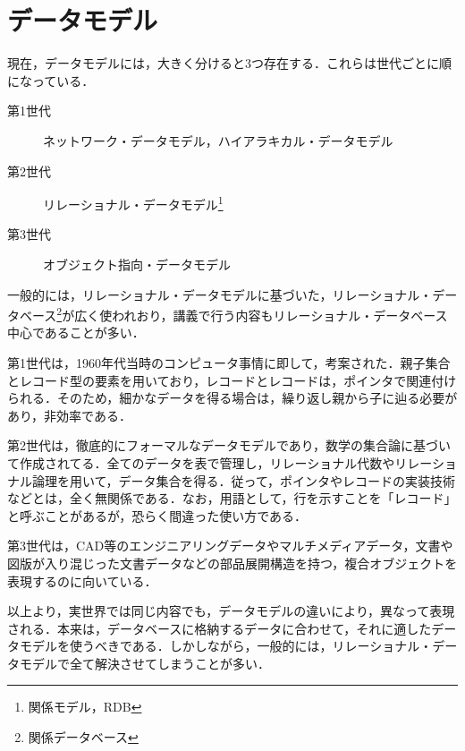 \documentclass[a4paper,10pt]{jreport}
\begin{document}
\section{データモデル}
\par 現在，データモデルには，大きく分けると3つ存在する．これらは世代ごとに順になっている．
\begin{description}
	\item[第1世代] ネットワーク・データモデル，ハイアラキカル・データモデル
	\item[第2世代] リレーショナル・データモデル\footnote{関係モデル，RDB}
	\item[第3世代] オブジェクト指向・データモデル
\end{description}
一般的には，リレーショナル・データモデルに基づいた，リレーショナル・データベース\footnote{関係データベース}が広く使われおり，講義で行う内容もリレーショナル・データベース中心であることが多い．
\par 第1世代は，1960年代当時のコンピュータ事情に即して，考案された．親子集合とレコード型の要素を用いており，レコードとレコードは，ポインタで関連付けられる．そのため，細かなデータを得る場合は，繰り返し親から子に辿る必要があり，非効率である．
\par 第2世代は，徹底的にフォーマルなデータモデルであり，数学の集合論に基づいて作成されてる．全てのデータを表で管理し，リレーショナル代数やリレーショナル論理を用いて，データ集合を得る．従って，ポインタやレコードの実装技術などとは，全く無関係である．なお，用語として，行を示すことを「レコード」と呼ぶことがあるが，恐らく間違った使い方である．
\par 第3世代は，CAD等のエンジニアリングデータやマルチメディアデータ，文書や図版が入り混じった文書データなどの部品展開構造を持つ，複合オブジェクトを表現するのに向いている．
\par 以上より，実世界では同じ内容でも，データモデルの違いにより，異なって表現される．本来は，データベースに格納するデータに合わせて，それに適したデータモデルを使うべきである．しかしながら，一般的には，リレーショナル・データモデルで全て解決させてしまうことが多い．
\end{document}
